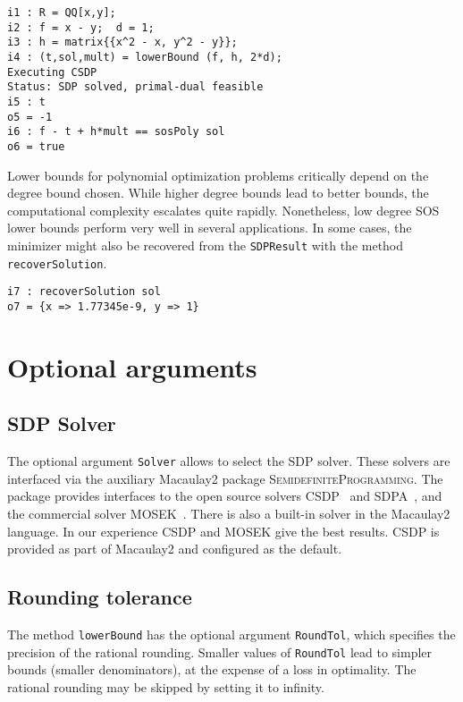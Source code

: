 \documentclass[11pt]{amsart}
\theoremstyle{plain}%
\theoremstyle{definition}
\theoremstyle{remark}
\newcommand{\Mac}{Macaulay2\xspace}
\newcommand{\SDP}{\textsc{SemidefiniteProgramming}\xspace}
\begin{document}
{\small
\begin{verbatim}
i1 : R = QQ[x,y];
i2 : f = x - y;  d = 1;
i3 : h = matrix{{x^2 - x, y^2 - y}};
i4 : (t,sol,mult) = lowerBound (f, h, 2*d);
Executing CSDP
Status: SDP solved, primal-dual feasible
i5 : t
o5 = -1
i6 : f - t + h*mult == sosPoly sol
o6 = true
\end{verbatim}
}

Lower bounds for polynomial optimization problems critically depend on the degree bound chosen.
While higher degree bounds lead to better bounds, the computational complexity escalates quite rapidly.
Nonetheless, low degree SOS lower bounds perform very well in several applications.
In some cases, the minimizer might also be recovered from the \verb|SDPResult| with the method \verb|recoverSolution|.

{\small
\begin{verbatim}
i7 : recoverSolution sol
o7 = {x => 1.77345e-9, y => 1}
\end{verbatim}
}

\section{Optional arguments}
\label{s:arguments}

\subsection*{SDP Solver}
The optional argument \verb|Solver| allows to select the SDP solver.
These solvers are interfaced via the auxiliary Macaulay2 package \SDP.
The package provides interfaces to the open source solvers CSDP~\cite{borchers1999csdp} and SDPA~\cite{yamashita2003implementation}, and the commercial solver MOSEK~\cite{mosek}.
There is also a built-in solver in the \Mac language.
In our experience CSDP and MOSEK give the best results.
CSDP is provided as part of \Mac and configured as the default.

\subsection*{Rounding tolerance}
The method \verb|lowerBound| has the optional argument \verb|RoundTol|, which specifies the precision of the rational rounding.
Smaller values of \verb|RoundTol| lead to simpler bounds (smaller denominators), at the expense of a loss in optimality.
The rational rounding may be skipped by setting it to infinity.
\end{document}
